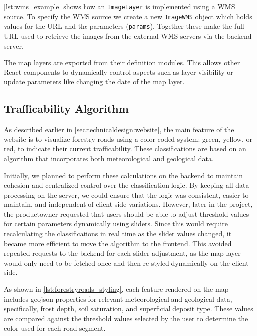 \autoref{lst:wms_example} shows how an \texttt{ImageLayer} is implemented using a WMS source. To specify the WMS source we create a new \texttt{ImageWMS} object which holds values for the URL and the parameters (\texttt{params}). Together these make the full URL used to retrieve the images from the external WMS servers via the backend server.

The map layers are exported from their definition modules. This allows other React components to dynamically control aspects such as layer visibility or update parameters like changing the date of the map layer.

\begin{figure}[h]

\end{figure}

\subsection{Trafficability Algorithm}\label{subsec:implementation:website:trafficability_algorithm}

As described earlier in \autoref{sec:technicaldesign:website}, the main feature of the website is to visualize forestry roads using a color-coded system: green, yellow, or red, to indicate their current trafficability.
These classifications are based on an algorithm that incorporates both meteorological and geological data.

Initially, we planned to perform these calculations on the backend to maintain cohesion and centralized control over the classification logic. By keeping all data processing on the server, we could ensure that the logic was consistent, easier to maintain, and independent of client-side variations. However, later in the project, the \gls{productowner} requested that users should be able to adjust threshold values for certain parameters dynamically using sliders. Since this would require recalculating the classifications in real time as the slider values changed, it became more efficient to move the algorithm to the frontend. This avoided repeated requests to the backend for each slider adjustment, as the map layer would only need to be fetched once and then re-styled dynamically on the client side.

As shown in \autoref{lst:forestryroads_styling}, each feature rendered on the map includes \gls{geojson} properties for relevant meteorological and geological data, specifically, frost depth, soil saturation, and superficial deposit type. These values are compared against the threshold values selected by the user to determine the color used for each road segment.


